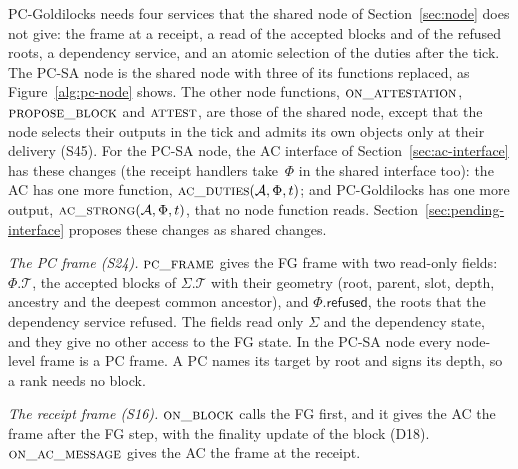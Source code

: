 \documentclass{article}
\newcommand{\T}{\mathcal T}
\newcommand{\AC}{\mathcal A}
\newcommand{\Fr}{\Phi}
\begin{document}
PC-Goldilocks needs four services that the shared node of
Section~\ref{sec:node} does not give: the frame at a receipt, a read of the
accepted blocks and of the refused roots, a dependency service, and an
atomic selection of the duties after the tick.  The PC-SA node is the
shared node with three of its functions replaced, as
Figure~\ref{alg:pc-node} shows.  The other node functions,
$\Call{on\_attestation}{}$, $\Call{propose\_block}{}$ and
$\Call{attest}{}$, are those of the shared node, except that the node
selects their outputs in the tick and admits its own objects only at
their delivery (S45).  For the PC-SA node, the AC interface of
Section~\ref{sec:ac-interface} has these changes (the receipt handlers
take~$\Fr$ in the shared interface too):
the AC has one more function, $\Call{ac\_duties}{\AC,\Fr,t}$; and
PC-Goldilocks has one more output, $\Call{ac\_strong}{\AC,\Fr,t}$, that no
node function reads.  Section~\ref{sec:pending-interface} proposes these
changes as shared changes.

\emph{The PC frame (S24).}  $\Call{pc\_frame}{}$ gives the FG frame with
two read-only fields: $\Fr.\T$, the accepted blocks of $\Sigma.\T$ with
their geometry (root, parent, slot, depth, ancestry and the deepest common
ancestor), and $\Fr.\mathsf{refused}$, the roots that the dependency
service refused.  The fields read only $\Sigma$ and the dependency state,
and they give no other access to the FG state.  In the PC-SA node every
node-level frame is a PC frame.  A PC names its target by root and signs
its depth, so a rank needs no block.

\emph{The receipt frame (S16).}  $\Call{on\_block}{}$ calls the FG first,
and it gives the AC the frame after the FG step, with the finality update
of the block (D18).  $\Call{on\_ac\_message}{}$ gives the AC the frame at
the receipt.
\end{document}
